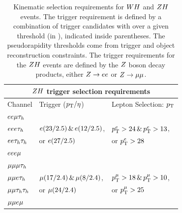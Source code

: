 \begin{table}[htbp]
\begin{small}
\begin{tabular}{lll}
\\
     \multicolumn{3}{c}{$ZH$ trigger selection requirements}                 \\ 
\hline
  Channel           &         Trigger ($p_\mathrm{T}/\eta$)         & Lepton Selection: $p_\mathrm{T}$             \\
\hline
  $ee\mu\tau_{h}$     &                                    &                                   \\ 
  $eee\tau_{h}$      & $e(23/2.5)\,\&\,e(12/2.5)$,    &  $p_\mathrm{T}^{e}>24\,\&\,p_\mathrm{T}^{e}>13$,    \\ 
  $ee\tau_{h}\tau_{h}$    & or $e(27/2.5)$                   &  or $p_\mathrm{T}^{e}>28$                  \\ 
  $eee\mu$       &                                    &                                   \\ 
\hline
  $\mu\mu\mu\tau_{h}$   &                                    &                                   \\ 
  $\mu\mu e\tau_{h}$    &  $\mu(17/2.4)\,\&\,\mu(8/2.4)$,  &  $p_\mathrm{T}^{\mu}>18\,\&\,p_\mathrm{T}^{\mu}>10$,  \\ 
  $\mu\mu\tau_{h}\tau_{h}$  &   or $\mu(24/2.4)$                &  or $p_\mathrm{T}^{\mu}>25$                 \\ 
  $\mu\mu e\mu$     &                                    &                                   \\ 
\hline
\end{tabular}
\end{small}
\caption{Kinematic selection requirements for $WH$ and $ZH$ events.
The trigger requirement is defined by a combination of trigger candidates with 
\pt over a given threshold (in \GeV), indicated inside parentheses. The 
pseudorapidity thresholds come from trigger and object reconstruction constraints.
The trigger requirements for the $ZH$ events are defined by the $Z$ boson
decay products, either $Z\to ee$ or $Z\to\mu\mu$.
\label{tab:vh_triggers}
}
\end{table}



